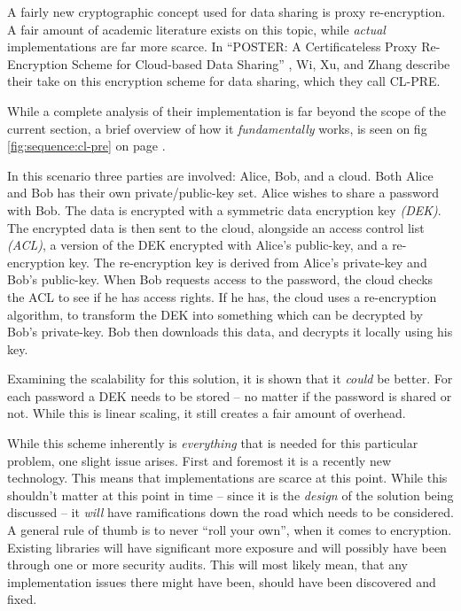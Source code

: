 				A fairly new cryptographic concept used for data sharing is proxy re-encryption. A fair amount of academic literature exists on this topic, while \emph{actual} implementations are far more scarce. In ``POSTER: A Certificateless Proxy Re-Encryption Scheme for Cloud-based Data Sharing'' \cite{Wu:2011:PCP:2046707.2093514}, Wi, Xu, and Zhang describe their take on this encryption scheme for data sharing, which they call CL-PRE.

				While a complete analysis of their implementation is far beyond the scope of the current section, a brief overview of how it \emph{fundamentally} works, is seen on fig \ref{fig:sequence:cl-pre} on page \pageref{fig:sequence:cl-pre}.

				In this scenario three parties are involved: Alice, Bob, and a cloud. Both Alice and Bob has their own private/public-key set. Alice wishes to share a password with Bob. The data is encrypted with a symmetric data encryption key \emph{(DEK)}. The encrypted data is then sent to the cloud, alongside an access control list \emph{(ACL)}, a version of the DEK encrypted with Alice's public-key, and a re-encryption key. The re-encryption key is derived from Alice's private-key and Bob's public-key. When Bob requests access to the password, the cloud checks the ACL to see if he has access rights. If he has, the cloud uses a re-encryption algorithm, to transform the DEK into something which can be decrypted by Bob's private-key. Bob then downloads this data, and decrypts it locally using his key.


				Examining the scalability for this solution, it is shown that it \emph{could} be better. For each password a DEK needs to be stored -- no matter if the password is shared or not. While this is linear scaling, it still creates a fair amount of overhead.

				While this scheme inherently is \emph{everything} that is needed for this particular problem, one slight issue arises. First and foremost it is a recently new technology. This means that implementations are scarce at this point. While this shouldn't matter at this point in time -- since it is the \emph{design} of the solution being discussed -- it \emph{will} have ramifications down the road which needs to be considered. A general rule of thumb is to never ``roll your own'', when it comes to encryption. Existing libraries will have significant more exposure and will possibly have been through one or more security audits. This will most likely mean, that any implementation issues there might have been, should have been discovered and fixed.

